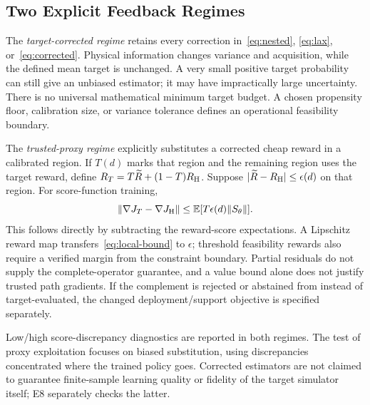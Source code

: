 \subsection{Two Explicit Feedback Regimes}
The \emph{target-corrected regime} retains every correction in~\eqref{eq:nested}, \eqref{eq:lax}, or~\eqref{eq:corrected}. Physical information changes variance and acquisition, while the defined mean target is unchanged. A very small positive target probability can still give an unbiased estimator; it may have impractically large uncertainty. There is no universal mathematical minimum target budget. A chosen propensity floor, calibration size, or variance tolerance defines an operational feasibility boundary.

The \emph{trusted-proxy regime} explicitly substitutes a corrected cheap reward in a calibrated region. If $T(d)$ marks that region and the remaining region uses the target reward, define $R_T=T\widetilde R+(1-T)R_{\mathrm{H}}$. Suppose $|\widetilde R-R_{\mathrm{H}}|\le\epsilon(d)$ on that region. For score-function training,
\begin{equation}
\|\nabla J_T-\nabla J_{\mathrm{H}}\|
 \le\mathbb{E}[T\epsilon(d)\|S_\theta\|].
\label{eq:trust-bias}
\end{equation}
This follows directly by subtracting the reward-score expectations. A Lipschitz reward map transfers~\eqref{eq:local-bound} to $\epsilon$; threshold feasibility rewards also require a verified margin from the constraint boundary. Partial residuals do not supply the complete-operator guarantee, and a value bound alone does not justify trusted path gradients. If the complement is rejected or abstained from instead of target-evaluated, the changed deployment/support objective is specified separately.

Low/high score-discrepancy diagnostics are reported in both regimes. The test of proxy exploitation focuses on biased substitution, using discrepancies concentrated where the trained policy goes. Corrected estimators are not claimed to guarantee finite-sample learning quality or fidelity of the target simulator itself; E8 separately checks the latter.

